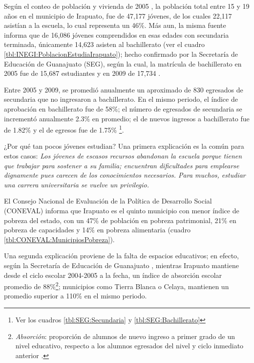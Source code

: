 Según el conteo de población y vivienda de 2005 \citep{Inegi2005}, la población total entre 15 y 19 años en el municipio de Irapuato, fue de 47,177 jóvenes, de los cuales 22,117 asistían a la escuela, lo cual representa un 46\%. Más aun, la misma fuente informa que de 16,086 jóvenes comprendidos en esas edades con secundaria terminada, únicamente 14,623 asisten al bachillerato (ver el cuadro \ref{tbl:INEGI:PoblacionEstudiaIrapuato}); hecho confirmado por la Secretaría de Educación de Guanajuato (SEG), según la cual, la matrícula de bachillerato en 2005 fue de 15,687 estudiantes y en 2009 de 17,734 \citep{Seg2010}.



Entre 2005 y 2009, se promedió anualmente un aproximado de 830 egresados de secundaria que no ingresaron a bachillerato. En el mismo periodo, el índice de aprobación en bachillerato fue de 58\%; el número de egresados de secundaria se incrementó anualmente 2.3\% en promedio; el de nuevos ingresos a bachillerato fue de 1.82\% y el de egresos fue de 1.75\% \citep{Seg2010}\footnote{Ver los cuadros \ref{tbl:SEG:Secundaria} y \ref{tbl:SEG:Bachillerato}}.

¿Por qué tan pocos jóvenes estudian? Una primera explicación es la común para estos casos: \emph{Los jóvenes de escasos recursos abandonan la escuela porque tienen que trabajar para sostener a su familia; encuentran dificultades para emplearse dignamente pues carecen de los conocimientos necesarios. Para muchos, estudiar una carrera universitaria se vuelve un privilegio.}

El Consejo Nacional de Evaluación de la Política de Desarrollo Social (CONEVAL) informa que Irapuato es el quinto municipio con menor índice de pobreza del estado, con un 47\% de población en pobreza patrimonial, 21\% en pobreza de capacidades y 14\% en pobreza alimentaria \citep{Coneval2009} (cuadro \ref{tbl:CONEVAL:MunicipiosPobreza}).

Una segunda explicación proviene de la falta de espacios educativos; en efecto, según la Secretaría de Educación de Guanajuato \citep{Seg2010}, mientras  Irapuato mantiene desde el ciclo escolar 2004-2005 a la fecha, un índice de absorción escolar promedio de 88\%\footnote{\emph{Absorción}: proporción de alumnos de nuevo ingreso a primer grado de un nivel educativo, respecto a los alumnos egresados del nivel y ciclo inmediato anterior \citep{Seg2010}.};
municipios como Tierra Blanca o Celaya, mantienen un promedio superior a 110\% en el mismo periodo.

